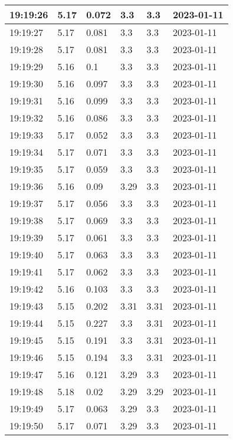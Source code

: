 \begin{longtable}{|l|l|l|l|l|l|}
        19:19:26 & 5.17 & 0.072 & 3.3 & 3.3 & 2023-01-11 \\ \hline
        19:19:27 & 5.17 & 0.081 & 3.3 & 3.3 & 2023-01-11 \\ \hline
        19:19:28 & 5.17 & 0.081 & 3.3 & 3.3 & 2023-01-11 \\ \hline
        19:19:29 & 5.16 & 0.1 & 3.3 & 3.3 & 2023-01-11 \\ \hline
        19:19:30 & 5.16 & 0.097 & 3.3 & 3.3 & 2023-01-11 \\ \hline
        19:19:31 & 5.16 & 0.099 & 3.3 & 3.3 & 2023-01-11 \\ \hline
        19:19:32 & 5.16 & 0.086 & 3.3 & 3.3 & 2023-01-11 \\ \hline
        19:19:33 & 5.17 & 0.052 & 3.3 & 3.3 & 2023-01-11 \\ \hline
        19:19:34 & 5.17 & 0.071 & 3.3 & 3.3 & 2023-01-11 \\ \hline
        19:19:35 & 5.17 & 0.059 & 3.3 & 3.3 & 2023-01-11 \\ \hline
        19:19:36 & 5.16 & 0.09 & 3.29 & 3.3 & 2023-01-11 \\ \hline
        19:19:37 & 5.17 & 0.056 & 3.3 & 3.3 & 2023-01-11 \\ \hline
        19:19:38 & 5.17 & 0.069 & 3.3 & 3.3 & 2023-01-11 \\ \hline
        19:19:39 & 5.17 & 0.061 & 3.3 & 3.3 & 2023-01-11 \\ \hline
        19:19:40 & 5.17 & 0.063 & 3.3 & 3.3 & 2023-01-11 \\ \hline
        19:19:41 & 5.17 & 0.062 & 3.3 & 3.3 & 2023-01-11 \\ \hline
        19:19:42 & 5.16 & 0.103 & 3.3 & 3.3 & 2023-01-11 \\ \hline
        19:19:43 & 5.15 & 0.202 & 3.31 & 3.31 & 2023-01-11 \\ \hline
        19:19:44 & 5.15 & 0.227 & 3.3 & 3.31 & 2023-01-11 \\ \hline
        19:19:45 & 5.15 & 0.191 & 3.3 & 3.31 & 2023-01-11 \\ \hline
        19:19:46 & 5.15 & 0.194 & 3.3 & 3.31 & 2023-01-11 \\ \hline
        19:19:47 & 5.16 & 0.121 & 3.29 & 3.3 & 2023-01-11 \\ \hline
        19:19:48 & 5.18 & 0.02 & 3.29 & 3.29 & 2023-01-11 \\ \hline
        19:19:49 & 5.17 & 0.063 & 3.29 & 3.3 & 2023-01-11 \\ \hline
        19:19:50 & 5.17 & 0.071 & 3.29 & 3.3 & 2023-01-11 \\ \hline

\end{longtable}
